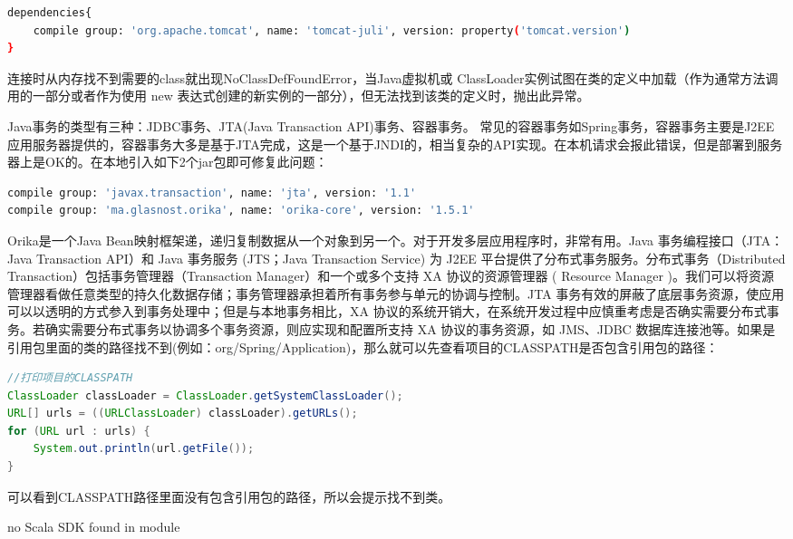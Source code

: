 \documentclass[12pt]{book}
\makeatletter
\numberwithin{dummy}{section}
\theoremstyle{ocrenumbox}
\theoremstyle{blacknumex}
\theoremstyle{blacknumbox}
\theoremstyle{ocrenum}
\renewcommand\paragraph{\@startsection{paragraph}{4}{\z@}
	{-2ex \@plus-.2ex \@minus .2ex}
	{.1ex}
	{\normalfont\small\sffamily\bfseries}}
\makeatother
\begin{document}
\begin{lstlisting}[language=Bash]
dependencies{
	compile group: 'org.apache.tomcat', name: 'tomcat-juli', version: property('tomcat.version')
}
\end{lstlisting}

连接时从内存找不到需要的class就出现NoClassDefFoundError，当Java虚拟机或 ClassLoader实例试图在类的定义中加载（作为通常方法调用的一部分或者作为使用 new 表达式创建的新实例的一部分），但无法找到该类的定义时，抛出此异常。 

Java事务的类型有三种：JDBC事务、JTA(Java Transaction API)事务、容器事务。 常见的容器事务如Spring事务，容器事务主要是J2EE应用服务器提供的，容器事务大多是基于JTA完成，这是一个基于JNDI的，相当复杂的API实现。在本机请求会报此错误，但是部署到服务器上是OK的。在本地引入如下2个jar包即可修复此问题：

\begin{lstlisting}[language=Bash]
compile group: 'javax.transaction', name: 'jta', version: '1.1'
compile group: 'ma.glasnost.orika', name: 'orika-core', version: '1.5.1'
\end{lstlisting}

Orika是一个Java Bean映射框架递，递归复制数据从一个对象到另一个。对于开发多层应用程序时，非常有用。Java 事务编程接口（JTA：Java Transaction API）和 Java 事务服务 (JTS；Java Transaction Service) 为 J2EE 平台提供了分布式事务服务。分布式事务（Distributed Transaction）包括事务管理器（Transaction Manager）和一个或多个支持 XA 协议的资源管理器 ( Resource Manager )。我们可以将资源管理器看做任意类型的持久化数据存储；事务管理器承担着所有事务参与单元的协调与控制。JTA 事务有效的屏蔽了底层事务资源，使应用可以以透明的方式参入到事务处理中；但是与本地事务相比，XA 协议的系统开销大，在系统开发过程中应慎重考虑是否确实需要分布式事务。若确实需要分布式事务以协调多个事务资源，则应实现和配置所支持 XA 协议的事务资源，如 JMS、JDBC 数据库连接池等。如果是引用包里面的类的路径找不到(例如：org/Spring/Application)，那么就可以先查看项目的CLASSPATH是否包含引用包的路径：

\begin{lstlisting}[language=Java]
//打印项目的CLASSPATH
ClassLoader classLoader = ClassLoader.getSystemClassLoader();
URL[] urls = ((URLClassLoader) classLoader).getURLs();
for (URL url : urls) {
	System.out.println(url.getFile());
}
\end{lstlisting}

可以看到CLASSPATH路径里面没有包含引用包的路径，所以会提示找不到类。

\paragraph{no Scala SDK found in module}
\end{document}
